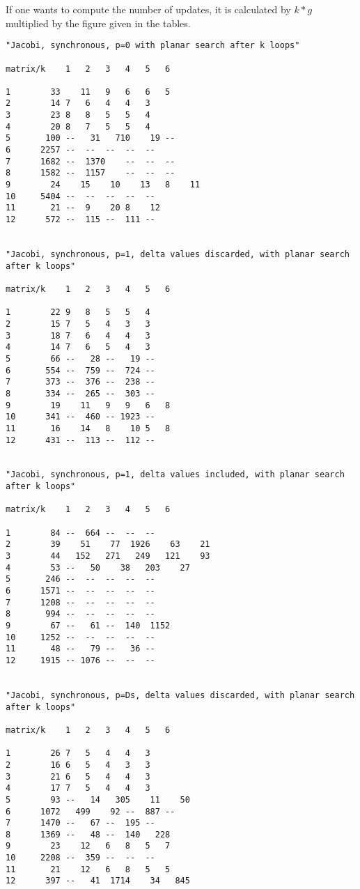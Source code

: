 \documentclass[12pt]{article}
\begin{document}
If one wants to compute the number of updates, it is calculated by $k*g$ multiplied by the figure given in the tables.
\begin{verbatim}
"Jacobi, synchronous, p=0 with planar search after k loops"	
										
matrix/k	1	2	3	4	5	6
							
1	     33    11	9	6	6	5							
2	     14	7	6	4	4	3							
3	     23	8	8	5	5	4							
4	     20	8	7	5	5	4							
5	    100	--   31   710    19	--							
6	   2257	--	--	--	--	--							
7	   1682	--  1370	--	--	--							
8	   1582	--  1157	--	--	--							
9	     24    15    10    13	8    11							
10	   5404	--	--	--	--	--							
11	     21	--	9    20	8    12							
12	    572	--  115	--  111	--							
													
												
"Jacobi, synchronous, p=1, delta values discarded, with planar search after k loops"												
													
matrix/k	1	2	3	4	5	6							
													
1	     22	9	8	5	5	4							
2	     15	7	5	4	3	3							
3	     18	7	6	4	4	3							
4	     14	7	6	5	4	3							
5	     66	--   28	--   19	--							
6	    554	--  759	--  724	--							
7	    373	--  376	--  238	--							
8	    334	--  265	--  303	--							
9	     19    11	9	9	6	8							
10	    341	--  460	-- 1923	--							
11	     16    14	8    10	5	8							
12	    431	--  113	--  112	--							
													
													
"Jacobi, synchronous, p=1, delta values included, with planar search after k loops"												
													
matrix/k	1	2	3	4	5	6			

1	     84	--  664	--	--	--							
2	     39    51    77  1926    63    21							
3	     44   152   271   249   121    93							
4	     53	--   50    38   203    27							
5	    246	--	--	--	--	--							
6	   1571	--	--	--	--	--							
7	   1208	--	--	--	--	--							
8	    994	--	--	--	--	--							
9	     67	--   61	--  140  1152							
10	   1252	--	--	--	--	--							
11	     48	--   79	--   36	--							
12	   1915	-- 1076	--	--	--							
													
													
"Jacobi, synchronous, p=Ds, delta values discarded, with planar search after k loops"												
													
matrix/k	1	2	3	4	5	6			

1	     26	7	5	4	4	3							
2	     16	6	5	4	3	3							
3	     21	6	5	4	4	3							
4	     17	7	5	4	4	3							
5	     93	--   14   305    11    50							
6	   1072   499    92	--  887	--							
7	   1470	--   67	--  195	--							
8	   1369	--   48	--  140   228							
9	     23    12	6	8	5	7							
10	   2208	--  359	--	--	--							
11	     21    12	6	8	5	5							
12	    397	--   41  1714    34   845							
													

\end{verbatim}
\end{document}
